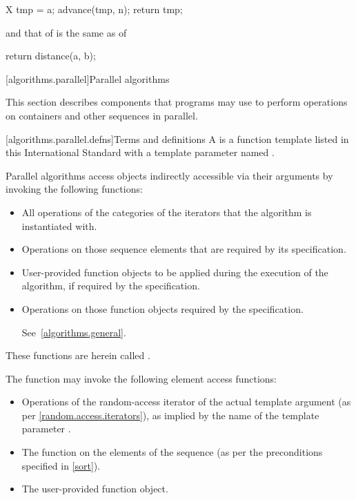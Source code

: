 \begin{codeblock}
X tmp = a;
advance(tmp, n);
return tmp;
\end{codeblock}

and that of
is the same as of

\begin{codeblock}
return distance(a, b);
\end{codeblock}

[algorithms.parallel]{Parallel algorithms}

\pnum
This section describes components that \Cpp programs may use to perform
operations on containers and other sequences in parallel.

[algorithms.parallel.defns]{Terms and definitions}
\pnum
A  is a function template listed in this International Standard with
a template parameter named .

\pnum
Parallel algorithms access objects indirectly accessible via their arguments by
invoking the following functions:

\begin{itemize}
\item
All operations of the categories of the iterators that the algorithm is
instantiated with.

\item
Operations on those sequence elements that are required by its specification.

\item
User-provided function objects to be applied during the execution of the
algorithm, if required by the specification.

\item
Operations on those function objects required by the specification.
\begin{note} See~\ref{algorithms.general}.\end{note}
\end{itemize}

These functions are herein called .
\begin{example}
The  function may invoke the following element access functions:

\begin{itemize}
\item
Operations of the random-access iterator of the actual template argument
(as per \ref{random.access.iterators}),
as implied by the name of the template parameter .

\item
The  function on the elements of the sequence (as per the
preconditions specified in \ref{sort}).

\item
The user-provided  function object.
\end{itemize}
\end{example}

